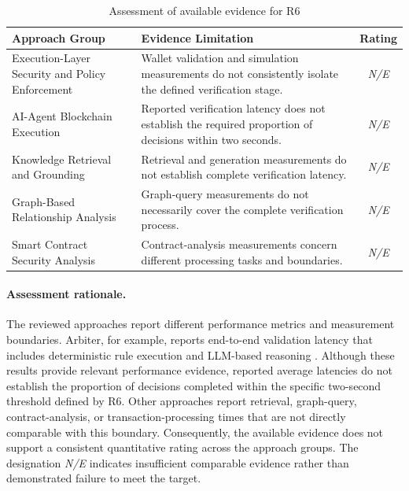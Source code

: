 \begin{table}[H]
\centering
\small
\renewcommand{\arraystretch}{1.25}
\begin{tabular}{p{4.4cm}p{7.0cm}c}
\hline
\textbf{Approach Group}
& \textbf{Evidence Limitation}
& \textbf{Rating} \\
\hline

Execution-Layer Security and Policy Enforcement
& Wallet validation and simulation measurements
do not consistently isolate the defined
verification stage.
& \textit{N/E} \\

AI-Agent Blockchain Execution
& Reported verification latency does not
establish the required proportion of
decisions within two seconds.
& \textit{N/E} \\

Knowledge Retrieval and Grounding
& Retrieval and generation measurements
do not establish complete verification
latency.
& \textit{N/E} \\

Graph-Based Relationship Analysis
& Graph-query measurements do not necessarily
cover the complete verification process.
& \textit{N/E} \\

Smart Contract Security Analysis
& Contract-analysis measurements concern
different processing tasks and boundaries.
& \textit{N/E} \\

\hline
\end{tabular}
\caption{Assessment of available evidence for R6}
\label{tab:appendix_r6}
\end{table}

\paragraph{Assessment rationale.}

The reviewed approaches report different
performance metrics and measurement boundaries.
Arbiter, for example, reports end-to-end
validation latency that includes deterministic
rule execution and LLM-based reasoning
\cite{yaoArbiter2026}. Although these results provide relevant
performance evidence, reported average
latencies do not establish the proportion
of decisions completed within the specific
two-second threshold defined by R6.
Other approaches report retrieval,
graph-query, contract-analysis, or
transaction-processing times that are
not directly comparable with this boundary. Consequently, the available evidence does
not support a consistent quantitative rating
across the approach groups. The designation
\textit{N/E} indicates insufficient comparable
evidence rather than demonstrated failure
to meet the target.

